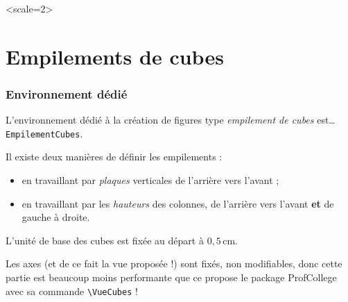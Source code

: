 \documentclass[french,a4paper,11pt]{article}
\begin{document}
\pagebreak

\begin{PresCode}{}
\begin{EnvTikzEspace}
	\PaveTikzTriDim[Cube,Largeur=3,Couleur=red,CouleurSommets=blue,AffLabel]
\end{EnvTikzEspace}
\end{PresCode}

\begin{PresCode}{}
\begin{EnvTikzEspace}[VueClassique]<scale=2>
	\PaveTikzTriDim[Largeur=3,Profondeur=4,Hauteur=2,Plein,Couleur=gray,AffLabel, CouleurSommets=gray]
\end{EnvTikzEspace}
\end{PresCode}

\newpage

\part{Empilements de cubes}

\section{Environnement dédié}

\begin{cautionblock}
L'environnement dédié à la création de figures type \textit{empilement de cubes} est\ldots{} \texttt{EmpilementCubes}.

Il existe deux manières de définir les empilements :

\begin{itemize}
	\item en travaillant par \textit{plaques} verticales de l'arrière vers l'avant ;
	\item en travaillant par les \textit{hauteurs} des colonnes, de l'arrière vers l'avant \textbf{et} de gauche à droite.
\end{itemize}

L'unité de base des cubes est fixée au départ à $0{,}5$\,cm.
\end{cautionblock}

\begin{importantblock}
Les axes (et de ce fait la vue proposée !) sont fixés, non modifiables, donc cette partie est beaucoup moins performante que ce propose le package \textsf{ProfCollege} avec sa commande \texttt{\textbackslash VueCubes} !
\end{importantblock}
\end{document}
